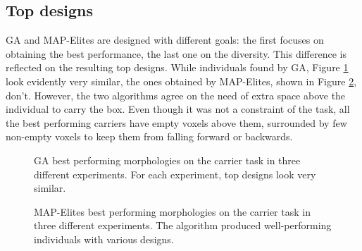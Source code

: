 \subsection{Top designs}
GA and MAP-Elites are designed with different goals: the first focuses on obtaining the best performance, the last one on the diversity. This difference is reflected on the resulting top designs. While individuals found by GA, Figure \ref{fig:ga_carrier_topdesigns} look evidently very similar, the ones obtained by MAP-Elites, shown in Figure \ref{fig:qd_carrier_topdesigns}, don't.
However, the two algorithms agree on the need of extra space above the individual to carry the box. Even though it was not a constraint of the task, all the best performing carriers have empty voxels above them, surrounded by few non-empty voxels to keep them from falling forward or backwards.

\begin{figure}[H]
    \centering
    
    \caption{GA best performing morphologies on the carrier task in three different experiments. For each experiment, top designs look very similar.}
    \label{fig:ga_carrier_topdesigns}
\end{figure}

\begin{figure}[H]
    \centering
    
    \caption{MAP-Elites best performing morphologies on the carrier task in three different experiments. The algorithm produced well-performing individuals with various designs.}
    \label{fig:qd_carrier_topdesigns}
\end{figure}



